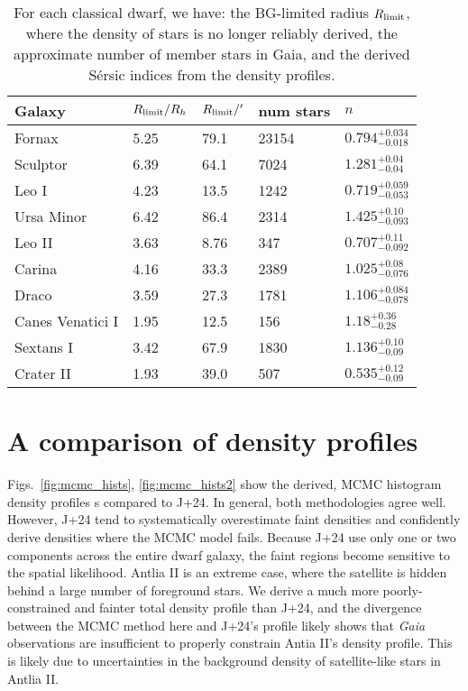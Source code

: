 \begin{table*}[t]
\centering
\caption[Properties of probabilistically-derived density profiles]{For each classical dwarf, we have: the BG-limited radius $R_{\rm limit}$, where the density of stars is no longer reliably derived, the approximate number of member stars in Gaia, and the derived Sérsic indices from the density profiles. }
\label{tbl:mcmc_props}
\begin{tabular}{lllll}
\toprule
Galaxy & $R_{\rm limit} / R_h$ & $R_{\rm limit} / '$ & num stars & $n$\\
\midrule
Fornax & 5.25 & 79.1 & 23154 & $0.794^{+0.034}_{-0.018}$\\
Sculptor & 6.39 & 64.1 & 7024 & $1.281^{+0.04}_{-0.04}$\\
Leo I & 4.23 & 13.5 & 1242 & $0.719^{+0.059}_{-0.053}$\\
Ursa Minor & 6.42 & 86.4 & 2314 & $1.425^{+0.10}_{-0.093}$\\
Leo II & 3.63 & 8.76 & 347 & $0.707^{+0.11}_{-0.092}$\\
Carina & 4.16 & 33.3 & 2389 & $1.025^{+0.08}_{-0.076}$\\
Draco & 3.59 & 27.3 & 1781 & $1.106^{+0.084}_{-0.078}$\\
Canes Venatici I & 1.95 & 12.5 & 156 & $1.18^{+0.36}_{-0.28}$\\
Sextans I & 3.42 & 67.9 & 1830 & $1.136^{+0.10}_{-0.09}$\\
Crater II & 1.93 & 39.0 & 507 & $0.535^{+0.12}_{-0.09}$\\
\bottomrule
\end{tabular}
\end{table*}

\section{A comparison of density
profiles}\label{a-comparison-of-density-profiles}

Figs.~\ref{fig:mcmc_hists}, \ref{fig:mcmc_hists2} show the derived, MCMC
histogram density profiles s compared to J+24. In general, both
methodologies agree well. However, J+24 tend to systematically
overestimate faint densities and confidently derive densities where the
MCMC model fails. Because J+24 use only one or two components across the
entire dwarf galaxy, the faint regions become sensitive to the spatial
likelihood. Antlia II is an extreme case, where the satellite is hidden
behind a large number of foreground stars. We derive a much more
poorly-constrained and fainter total density profile than J+24, and the
divergence between the MCMC method here and J+24's profile likely shows
that \emph{Gaia} observations are insufficient to properly constrain
Antia II's density profile. This is likely due to uncertainties in the
background density of satellite-like stars in Antlia II.

